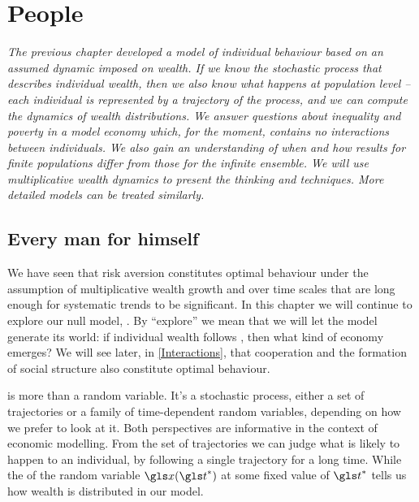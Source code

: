 
\chapter{People}
{\it 
The previous chapter developed a model of individual behaviour based on an
assumed dynamic imposed on wealth. If we know the stochastic process that describes
individual wealth, then we also know what happens at population level -- each individual
is represented by a trajectory of the process, and we can compute 
the dynamics of wealth distributions. We answer questions about inequality and poverty in
a model economy which, for the moment, contains no interactions between individuals. We also gain an understanding of when and how results for finite populations differ from those for the infinite ensemble. We will use multiplicative wealth dynamics to present the thinking and techniques. More detailed models can be treated similarly.}
\newpage


\section{Every man for himself}

We have seen that risk aversion constitutes optimal behaviour under the assumption 
of multiplicative wealth growth and over time scales that are long enough for systematic 
trends to be significant. In this chapter we will continue to explore our null model, 
\GBM. By ``explore'' we mean that we will let the model generate its world: if 
individual wealth follows \GBM, then what kind of economy emerges? 
We will see later, in \cref{Interactions}, that cooperation and the formation of social structure also constitute optimal behaviour.

\GBM is more than a random variable. It's a stochastic process, either a set of trajectories 
or a family of time-dependent random variables, depending on how we 
prefer to look at it.  Both perspectives are informative in the context of economic modelling.
From the set of trajectories we can judge what is likely to happen to an individual, 
\eg by following a single trajectory for a long time. While the \PDFa of the random 
variable $\x(\t^*)$ at some fixed value of $\t^*$ tells us how wealth is distributed in our model. 

